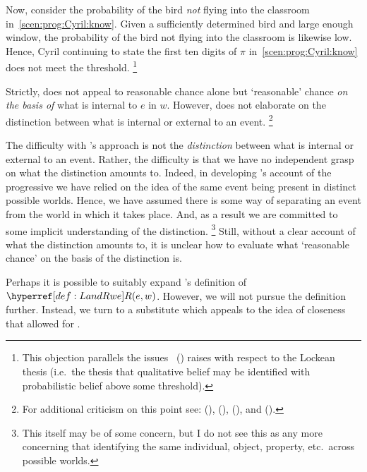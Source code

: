 \begin{note}
  Now, consider the probability of the bird \emph{not} flying into the classroom in~\autoref{scen:prog:Cyril:know}.
  Given a sufficiently determined bird and large enough window, the probability of the bird not flying into the classroom is likewise low.
  Hence, Cyril continuing to state the first ten digits of \(\pi\) in~\autoref{scen:prog:Cyril:know} does not meet the threshold.%
  \footnote{
    This objection parallels the issues~\citeauthor{Foley:2009vl} (\citeyear{Foley:2009vl}) raises with respect to the Lockean thesis (i.e.~the thesis that qualitative belief may be identified with probabilistic belief above some threshold).
  }

  Strictly, \citeauthor{Landman:1992wh} does not appeal to reasonable chance alone but `reasonable' chance \emph{on the basis of} what is internal to \(e\) in \(w\).
  However, \citeauthor{Landman:1992wh} does not elaborate on the distinction between what is internal or external to an event.%
  \footnote{
    For additional criticism on this point see:
    (\cite[35]{Szabo:2004ul}), (\cite[203,fn.2]{Bonomi:1997uq}), (\cite[49--50]{Engelberg:1999vi}), and (\cite[767]{Portner:1998um}).
  }

  The difficulty with \citeauthor{Landman:1992wh}'s approach is not the \emph{distinction} between what is internal or external to an event.
  Rather, the difficulty is that we have no independent grasp on what the distinction amounts to.
  Indeed, in developing \citeauthor{Landman:1992wh}'s account of the progressive we have relied on the idea of the same event being present in distinct possible worlds.
  Hence, we have assumed there is some way of separating an event from the world in which it takes place.
  And, as a result we are committed to some implicit understanding of the distinction.
  \footnote{
    This itself may be of some concern, but I do not see this as any more concerning that identifying the same individual, object, property, etc.\ across possible worlds.
  }
  Still, without a clear account of what the distinction amounts to, it is unclear how to evaluate what `reasonable chance' on the basis of the distinction is.

  Perhaps it is possible to suitably expand \citeauthor{Landman:1992wh}'s definition of \(\lRwe{w}{e}\).
  However, we will not pursue the definition further.
  Instead, we turn to a substitute which appeals to the idea of closeness that allowed for .
\end{note}

